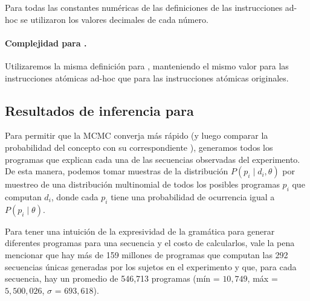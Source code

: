 Para todas las constantes numéricas de las definiciones de las instrucciones ad-hoc se utilizaron los valores decimales de cada número.

\paragraph{Complejidad para \gramgeoprima.} 

Utilizaremos la misma definición para \mdlgeo, manteniendo el mismo valor para las instrucciones atómicas ad-hoc que para las instrucciones atómicas originales.

\subsection{Resultados de inferencia para \gramgeoprima}


Para permitir que la MCMC converja más rápido (y luego comparar la probabilidad del concepto con su correspondiente \mdlgeo), generamos todos los programas que explican cada una de las secuencias observadas del experimento. De esta manera, podemos tomar muestras de la distribución $P(p_i \mid d_i, \theta)$ por muestreo de una distribución multinomial de todos los posibles programas $p_i$ que computan $d_i$, donde cada $p_i$ tiene una probabilidad de ocurrencia igual a $P(p_i \mid \theta)$.


Para tener una intuición de la expresividad de la gramática para generar diferentes programas para una secuencia y el costo de calcularlos, vale la pena mencionar que hay más de 159 millones de programas que computan las 292 secuencias únicas generadas por los sujetos en el experimento y que, para cada secuencia, hay un promedio de 546,713 programas (mín = $10,749$, máx = $5,500,026$, $\sigma$ = $693,618$).

